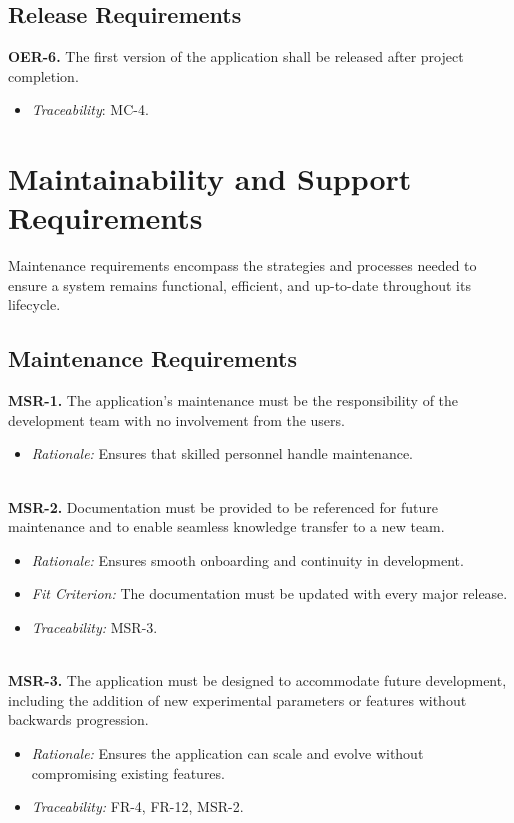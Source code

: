 \documentclass[12pt]{article}
\begin{document}
\subsection{Release Requirements}
\textbf{OER-6.} The first version of the application shall be released after project completion.
    \begin{itemize}
      \item \textit{Traceability}: MC-4.
    \end{itemize}

\section{Maintainability and Support Requirements}
Maintenance requirements encompass the strategies and processes needed to ensure
a system remains functional, efficient, and up-to-date throughout its lifecycle.

\subsection{Maintenance Requirements}
\textbf{MSR-1.} The application’s maintenance must be the
  responsibility of the development team with no involvement from the users.
  \begin{itemize}
    \item \textit{Rationale:} Ensures that skilled personnel handle maintenance.
  \end{itemize}
\ \\
\textbf{MSR-2.} Documentation must be provided to be referenced for
  future maintenance and to enable seamless knowledge transfer to a new team.
  \begin{itemize}
    \item \textit{Rationale:} Ensures smooth onboarding and continuity in
    development.
    \item \textit{Fit Criterion:} The documentation must be updated with every
    major release.
    \item \textit{Traceability:} MSR-3.
  \end{itemize}
\ \\
\textbf{MSR-3.} The application must be designed to accommodate future
  development, including the addition of new experimental parameters or features
  without backwards progression.
  \begin{itemize}
    \item \textit{Rationale:} Ensures the application can scale and evolve
    without compromising existing features.
    \item \textit{Traceability:} FR-4, FR-12, MSR-2.
  \end{itemize}
\end{document}
